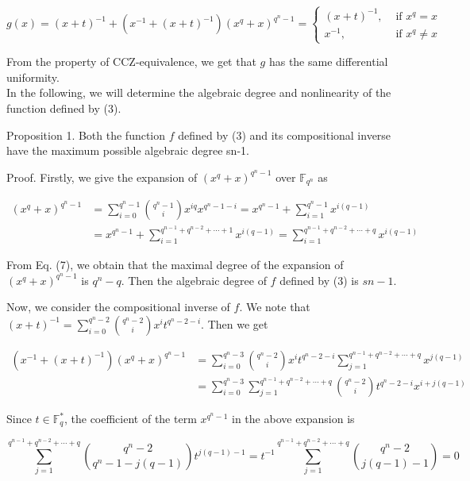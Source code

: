 \documentclass[10pt]{article}
\begin{document}
$$
g(x)=(x+t)^{-1}+\left(x^{-1}+(x+t)^{-1}\right)\left(x^{q}+x\right)^{q^{n}-1}= \begin{cases}(x+t)^{-1}, & \text { if } x^{q}=x \\ x^{-1}, & \text { if } x^{q} \neq x\end{cases}
$$

From the property of CCZ-equivalence, we get that $g$ has the same differential uniformity.\\
In the following, we will determine the algebraic degree and nonlinearity of the function defined by (3).

Proposition 1. Both the function $f$ defined by (3) and its compositional inverse have the maximum possible algebraic degree sn-1.

Proof. Firstly, we give the expansion of $\left(x^{q}+x\right)^{q^{n}-1}$ over $\mathbb{F}_{q^{n}}$ as


\begin{align*}
\left(x^{q}+x\right)^{q^{n}-1} & =\sum_{i=0}^{q^{n}-1}\binom{q^{n}-1}{i} x^{i q} x^{q^{n}-1-i}=x^{q^{n}-1}+\sum_{i=1}^{q^{n}-1} x^{i(q-1)} \\
& =x^{q^{n}-1}+\sum_{i=1}^{q^{n-1}+q^{n-2}+\cdots+1} x^{i(q-1)}=\sum_{i=1}^{q^{n-1}+q^{n-2}+\cdots+q} x^{i(q-1)} \tag{7}
\end{align*}


From Eq. (7), we obtain that the maximal degree of the expansion of $\left(x^{q}+x\right)^{q^{n}-1}$ is $q^{n}-q$. Then the algebraic degree of $f$ defined by (3) is $s n-1$.

Now, we consider the compositional inverse of $f$. We note that $(x+t)^{-1}=\sum_{i=0}^{q^{n}-2}\binom{q^{n}-2}{i} x^{i} t^{q^{n}-2-i}$. Then we get

$$
\begin{aligned}
\left(x^{-1}+(x+t)^{-1}\right)\left(x^{q}+x\right)^{q^{n}-1} & =\sum_{i=0}^{q^{n}-3}\binom{q^{n}-2}{i} x^{i} t^{q^{n}-2-i} \sum_{j=1}^{q^{n-1}+q^{n-2}+\cdots+q} x^{j(q-1)} \\
& =\sum_{i=0}^{q^{n}-3} \sum_{j=1}^{q^{n-1}+q^{n-2}+\cdots+q}\binom{q^{n}-2}{i} t^{q^{n}-2-i} x^{i+j(q-1)}
\end{aligned}
$$

Since $t \in \mathbb{F}_{q}^{*}$, the coefficient of the term $x^{q^{n}-1}$ in the above expansion is

$$
\sum_{j=1}^{q^{n-1}+q^{n-2}+\cdots+q}\binom{q^{n}-2}{q^{n}-1-j(q-1)} t^{j(q-1)-1}=t^{-1} \sum_{j=1}^{q^{n-1}+q^{n-2}+\cdots+q}\binom{q^{n}-2}{j(q-1)-1}=0
$$
\end{document}

